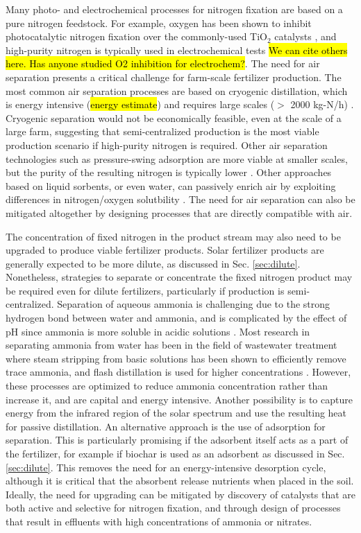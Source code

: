 Many photo- and electrochemical processes for nitrogen fixation are based on a pure nitrogen feedstock. For example, oxygen has been shown to inhibit photocatalytic nitrogen fixation over the commonly-used TiO$_2$ catalysts \cite{Hirakawa_2017}, and high-purity nitrogen is typically used in electrochemical tests \cite{Song_2018} \hl{We can cite others here. Has anyone studied O2 inhibition for electrochem?}. The need for air separation presents a critical challenge for farm-scale fertilizer production. The most common air separation processes are based on cryogenic distillation, which is energy intensive (\hl{energy estimate}) and requires large scales ($>$ 2000 kg-N/h) \needcite. Cryogenic separation would not be economically feasible, even at the scale of a large farm, suggesting that semi-centralized production is the most viable production scenario if high-purity nitrogen is required. Other air separation technologies such as pressure-swing adsorption are more viable at smaller scales, but the purity of the resulting nitrogen is typically lower \needcite. Other approaches based on liquid sorbents, or even water, can passively enrich air by exploiting differences in nitrogen/oxygen solutbility \needcite. The need for air separation can also be mitigated altogether by designing processes that are directly compatible with air.

The concentration of fixed nitrogen in the product stream may also need to be upgraded to produce viable fertilizer products. Solar fertilizer products are generally expected to be more dilute, as discussed in Sec. \ref{sec:dilute}. Nonetheless, strategies to separate or concentrate the fixed nitrogen product may be required even for dilute fertilizers, particularly if production is semi-centralized. Separation of aqueous ammonia is challenging due to the strong hydrogen bond between water and ammonia, and is complicated by the effect of pH since ammonia is more soluble in acidic solutions \needcite. Most research in separating ammonia from water has been in the field of wastewater treatment where steam stripping from basic solutions has been shown to efficiently remove trace ammonia, and flash distillation is used for higher concentrations \needcite. However, these processes are optimized to reduce ammonia concentration rather than increase it, and are capital and energy intensive. Another possibility is to capture energy from the infrared region of the solar spectrum and use the resulting heat for passive distillation. An alternative approach is the use of adsorption for separation. This is particularly promising if the adsorbent itself acts as a part of the fertilizer, for example if biochar is used as an adsorbent as discussed in Sec. \ref{sec:dilute}. This removes the need for an energy-intensive desorption cycle, although it is critical that the absorbent release nutrients when placed in the soil. Ideally, the need for upgrading can be mitigated by discovery of catalysts that are both active and selective for nitrogen fixation, and through design of processes that result in effluents with high concentrations of ammonia or nitrates.

